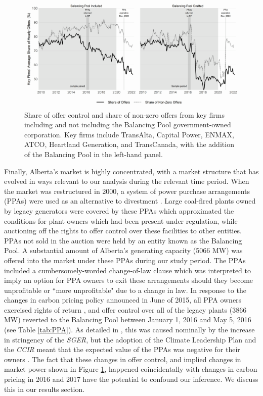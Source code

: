 \documentclass[12pt]{article}
\begin{document}
\begin{figure}[!h]
    \centering
    \begin{minipage}{\textwidth}
        \centering
        \includegraphics[width=.9\textwidth]{../images/mkt_power.png}
        \caption{Share of offer control and share of non-zero offers from key firms including and not including the Balancing Pool government-owned corporation. Key firms include TransAlta, Capital Power, ENMAX, ATCO, Heartland Generation, and TransCanada, with the addition of the Balancing Pool in the left-hand panel.}
    \label{fig:mkt_power}
    \end{minipage}%
\end{figure}


Finally, Alberta's market is highly concentrated, with a market structure that has evolved in ways relevant to our analysis during the relevant time period. When the market was restructured in 2000, a system of power purchase arrangements (PPAs) were used as an alternative to divestment \cite{kleit_electricity_2007}. Large coal-fired plants owned by legacy generators were covered by these PPAs which approximated the conditions for plant owners which had been present under regulation, while auctioning off the rights to offer control over these facilities to other entities. PPAs not sold in the auction were held by an entity known as the Balancing Pool. A substantial amount of Alberta's generating capacity (5066 MW) was offered into the market under these PPAs during our study period. The PPAs included a cumbersomely-worded change-of-law clause which was interpreted to imply an option for PPA owners to exit these arrangements should they become unprofitable or ``more unprofitable" due to a change in law. In response to the changes in carbon pricing policy announced in June of 2015, all PPA owners exercised rights of return \cite{bankes_termination_2016}, and offer control over all of the legacy plants (3866 MW) reverted to the Balancing Pool between January 1, 2016 and May 5, 2016 (see Table \ref{tab:PPA}). As detailed in \cite{leach_tombe_ppa}, this was caused nominally by the increase in stringency of the \textit{SGER}, but the adoption of the Climate Leadership Plan and the \textit{CCIR} meant that the expected value of the PPAs was negative for their owners \cite{leach_tombe_ppa}. The fact that these changes in offer control, and implied changes in market power shown in Figure \ref{fig:mkt_power}, happened coincidentally with changes in carbon pricing in 2016 and 2017 have the potential to confound our inference. We discuss this in our results section.
\end{document}
